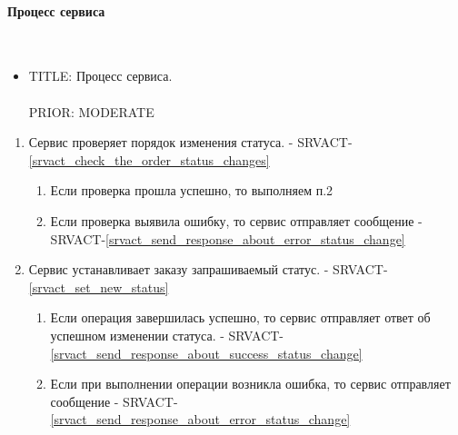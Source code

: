     \paragraph{Процесс сервиса} \mbox{} \\

        \begin{itemize}

             \item {
               TITLE: Процесс сервиса.\\
               \\
               PRIOR: MODERATE\\
             }

             \end{itemize}

        \begin{alg} \label{alg_order_status_processing} \mbox{}

             \begin{enumerate}

               \item Сервис проверяет порядок изменения статуса. - SRVACT-\ref{srvact_check_the_order_status_changes}

	               	\begin{enumerate}

		               	\item Если проверка прошла успешно, то выполняем п.2
	              
	               		\item Если проверка выявила ошибку, то сервис отправляет сообщение - SRVACT-\ref{srvact_send_response_about_error_status_change}

	               	\end{enumerate}

               \item Сервис устанавливает заказу запрашиваемый статус. - SRVACT-\ref{srvact_set_new_status}

	               	\begin{enumerate}

		               	\item Если операция завершилась успешно, то сервис отправляет ответ об успешном изменении статуса. - SRVACT-\ref{srvact_send_response_about_success_status_change}
	              
	               		\item Если при выполнении операции возникла ошибка, то сервис отправляет сообщение - SRVACT-\ref{srvact_send_response_about_error_status_change}

	               	\end{enumerate}

             \end{enumerate}

             \end{alg}

